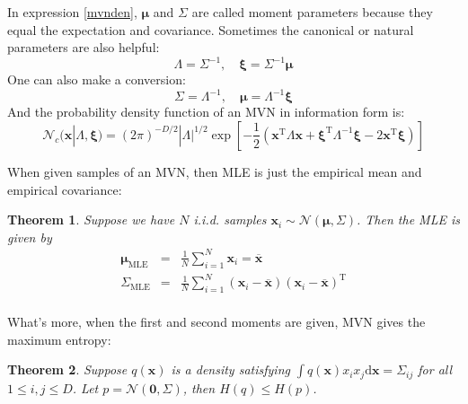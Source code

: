 \documentclass[openany]{book}
\newtheorem{theorem}{Theorem}[chapter]
\begin{document}
In expression \eqref{mvnden}, $\boldsymbol{\mu}$ and $\Sigma$ are called moment parameters because they equal the expectation and covariance. Sometimes the canonical or natural parameters are also helpful:
\begin{equation}\label{canonical}
\Lambda=\Sigma^{-1},\quad\boldsymbol{\xi}=\Sigma^{-1}\boldsymbol{\mu}
\end{equation}
One can also make a conversion:
\begin{equation}\label{moment}
\Sigma=\Lambda^{-1},\quad\boldsymbol{\mu}=\Lambda^{-1}\boldsymbol{\xi}
\end{equation}
And the probability density function of an MVN in information form is:
\begin{equation}\label{mvndeninf}
\mathcal{N}_c(\mathbf{x}|\Lambda,\boldsymbol{\xi})=(2\pi)^{-D/2}|\Lambda|^{1/2}\exp[-\frac{1}{2}(\mathbf{x}^{\mathrm{T}}\Lambda\mathbf{x}+\boldsymbol{\xi}^{\mathrm{T}}\Lambda^{-1}\boldsymbol{\xi}-2\mathbf{x}^{\mathrm{T}}\boldsymbol{\xi})]
\end{equation}

When given samples of an MVN, then MLE is just the empirical  mean and empirical covariance:
\begin{theorem}\label{mvnmlet}
Suppose we have $N$ i.i.d. samples $\mathbf{x}_i\sim\mathcal{N}(\boldsymbol{\mu},\Sigma)$. Then the MLE is given by
\begin{equation}\label{mvnmle}
\begin{array}{rcl}
\boldsymbol{\mu}_{\mathrm{MLE}} & = & \frac{1}{N}\sum_{i=1}^N\mathbf{x}_i=\overline{\mathbf{x}} \\
\Sigma_{\mathrm{MLE}} & = & \frac{1}{N}\sum_{i=1}^N(\mathbf{x}_i-\overline{\mathbf{x}})(\mathbf{x}_i-\overline{\mathbf{x}})^{\mathrm{T}} \\
\end{array}
\end{equation}
\end{theorem}

What's more, when the first and second moments are given, MVN gives the maximum entropy:
\begin{theorem}\label{mvnentropyt}
Suppose $q(\mathbf{x})$ is a density satisfying $\int q(\mathbf{x})x_ix_j\mathrm{d}\mathbf{x}=\Sigma_{ij}$ for all $1\le i,j\le D$. Let $p=\mathcal{N}(\mathbf{0},\Sigma)$, then $H(q)\le H(p)$.
\end{theorem}
\end{document}
